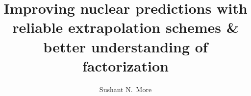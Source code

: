 \documentclass[11pt, phd]{osudissert96}
\title{
	\texorpdfstring{
		Improving nuclear predictions with reliable extrapolation schemes \&
		better understanding of factorization
	}{
		Improving nuclear predictions with reliable extrapolation schemes \&
		better understanding of factorization
	}
}
\author{Sushant N.\ More}
\begin{document}
\maketitle
\disscopyright
\clearpage


\dedication{To the memory of my late grandparents, who valued integrity and 
 education above everything else.}



\tableofcontents 

\clearpage

\clearpage



\startdoublespace



 







\appendix
% 

\end{document}

